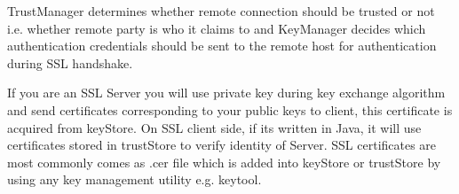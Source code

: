 \documentclass[a4paper,11pt,french]{article}
\begin{document}
TrustManager determines whether remote connection should be trusted or not i.e. whether remote party is who it claims to and KeyManager decides which authentication credentials should be sent to the remote host for authentication during SSL handshake.

If you are an SSL Server you will use private key during key exchange algorithm and send certificates corresponding to your public keys to client, this certificate is acquired from keyStore. On SSL client side, if its written in Java, it will use certificates stored in trustStore to verify identity of Server. SSL certificates are most commonly comes as .cer file which is added into keyStore or trustStore by using any key management utility e.g. keytool.
\end{document}

